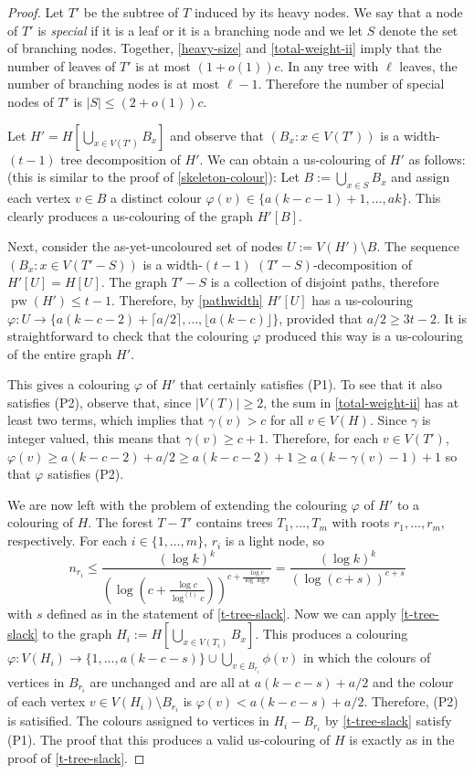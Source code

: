 \documentclass[kpfonts]{patmorin}
\DeclareMathOperator{\pw}{pw}
\theoremstyle{named}
\begin{document}
\begin{proof}
    Let $T'$ be the subtree of $T$ induced by its heavy nodes.  We say that a node of $T'$ is \emph{special} if it is a leaf or it is a branching node and we let $S$ denote the set of branching nodes.  Together, \cref{heavy-size} and \cref{total-weight-ii} imply that the number of leaves of $T'$ is at most $(1+o(1))c$.  In any tree with $\ell$ leaves, the number of branching nodes is at most $\ell-1$.  Therefore the number of special nodes of $T'$ is $|S|\le (2+o(1))c$.

    Let $H'=H[\bigcup_{x\in V(T')} B_x]$ and observe that $(B_x:x\in V(T'))$ is a width-$(t-1)$ tree decomposition of $H'$.  We can obtain a us-colouring of $H'$ as follows: (this is similar to the proof of \cref{skeleton-colour}):  Let $B:=\bigcup_{x\in S} B_x$ and assign each vertex  $v\in B$ a distinct colour $\varphi(v)\in\{a(k-c-1)+1,\ldots,ak\}$.  This clearly produces a us-colouring of the graph $H'[B]$.

    Next, consider the as-yet-uncoloured set of nodes $U:=V(H')\setminus B$. The sequence $(B_x:x\in V(T'-S))$ is a width-$(t-1)$ $(T'-S)$-decomposition of $H'[U]=H[U]$. The graph $T'-S$ is a collection of disjoint paths, therefore $\pw(H')\le t-1$. Therefore, by \cref{pathwidth} $H'[U]$ has a us-colouring $\varphi:U\to \{a(k-c-2)+\lceil a/2\rceil,\ldots,\lfloor a(k-c)\rfloor\}$, provided that $a/2\ge 3t-2$.  It is straightforward to check that the colouring $\varphi$ produced this way is a us-colouring of the entire graph $H'$.

    This gives a colouring $\varphi$ of $H'$ that certainly satisfies (P1).  To see that it also satisfies (P2), observe that, since $|V(T)|\ge 2$, the sum in \cref{total-weight-ii} has at least two terms, which implies that $\gamma(v) > c$ for all $v\in V(H)$. Since $\gamma$ is integer valued, this means that $\gamma(v)\ge c+1$.  Therefore, for each $v\in V(T')$, $\varphi(v)\ge a(k-c-2)+a/2 \ge a(k-c-2)+1\ge a(k-\gamma(v)-1)+1$ so that $\varphi$ satisfies (P2).

    We are now left with the problem of extending the colouring $\varphi$ of $H'$ to a colouring of $H$.  The forest $T-T'$ contains trees $T_1,\ldots,T_m$ with roots $r_1,\ldots,r_m$, respectively.  For each $i\in\{1,\ldots,m\}$, $r_i$ is a light node, so
    \[
        n_{r_i} \le \frac{(\log k)^k}{\left(\log\left(c + \frac{\log c}{\log^{(t)} c}\right)\right)^{c+\frac{\log c}{\log\log c}}}
        = \frac{(\log k)^k}{\left(\log\left(c + s\right)\right)^{c+s}}
    \]
    with $s$ defined as in the statement of \cref{t-tree-slack}.
    Now we can apply \cref{t-tree-slack} to the graph $H_{i}:=H[\bigcup_{x\in V(T_{i})} B_x]$.  This produces a colouring $\varphi:V(H_i)\to\{1,\ldots,a(k-c-s)\}\cup \bigcup_{v\in B_{r_i}}\phi(v)$ in which the colours of vertices in $B_{r_i}$ are unchanged and are all at $a(k-c-s)+a/2$ and the colour of each vertex $v\in V(H_i)\setminus B_{r_i}$ is $\varphi(v)<a(k-c-s)+a/2$.  Therefore, (P2) is satisified.  The colours assigned to vertices in $H_i-B_{r_i}$ by \cref{t-tree-slack} satisfy (P1).
    The proof that this produces a valid us-colouring of $H$ is exactly as in the proof of \cref{t-tree-slack}.
\end{proof}
\end{document}
